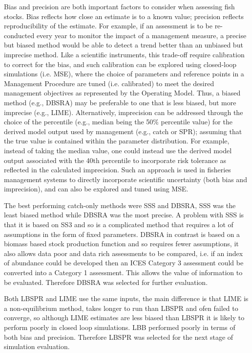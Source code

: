 Bias and precision are both important factors to consider when assessing fish stocks. Bias reflects how close an estimate is to a known value; precision reflects reproducibility of the estimate. For example, if an assessment is to be re-conducted every year to monitor the impact of a management measure, a precise but biased method would be able to detect a trend better than an unbiased but imprecise method. Like a scientific instruments, this trade-off require calibration to correct for the bias, and such calibration can be explored using closed-loop simulations (i.e. MSE), where the choice of parameters and reference points in a Management Procedure are tuned (i.e. calibrated) to meet the desired management objectives as represented by the Operating Model. Thus, a biased method (e.g., DBSRA) may be preferable to one that is less biased, but more imprecise (e.g., LIME). Alternatively, imprecision can be addressed through the choice of the percentile (e.g., median being the 50\% percentile value) for the derived model output used by management (e.g., catch or SPR); assuming that the true value is contained within the parameter distribution. For example, instead of taking the median value, one could instead use the derived model output associated with the 40th percentile to incorporate risk tolerance as reflected in the calculated imprecision. Such an approach \citep{Ralston2011meta} is used in fisheries management systems to directly incorporate scientific uncertainty (both bias and imprecision), and can also be explored and tuned using MSE.

The best performing catch-only methods were SSS and DBSRA, SSS was the least biased method while DBSRA was the most precise. A problem with SSS is that it is based on SS3 and so is a complicated method that requires a lot of assumptions in the form of fixed parameters. DBSRA in contrast is based on a biomass based stock production function and so requires fewer assumptions, it also allows data poor and data rich assessments to be compared, i.e. if an index of abundance could be developed then an ICES Category 3 assessment could be converted into a Category 1 assessment. This allows the value of information to be evaluated. Therefore DBSRA was selected for further evaluation.  

Both LBSPR and LIME use the same inputs, the main difference is that LIME is a non-equilibrium method, takes longer to run than LBSPR and ofen failed to converge, so although LIME estimates are less biased than LBSPR it is likely to perform poorly in closed loop simulations. LBB performed poorly in terms of both bias and precision. Therefore LBSPR was selected for the next stage of simulation evaluation.

